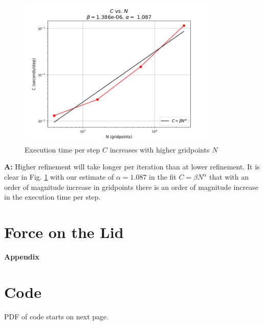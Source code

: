 \documentclass[11pt]{article}
\begin{document}
\begin{figure}[H]
   \centering
   \includegraphics[width=0.85\textwidth]{images/Refinement_Measure.png}
   \caption{Execution time per step $C$ increases with higher gridpoints $N$}
   \label{timerefine}
\end{figure}

\begin{center} 
\end{center}

\textbf{A:} Higher refinement will take longer per iteration than at lower refinement. It is clear in Fig. \ref{timerefine} with our estimate of $\alpha = 1.087$ in the fit $C = \beta N^{\alpha}$ that with an order of magnitude increase in gridpoints there is an order of magnitude increase in the execution time per step.

\pagebreak

\section{Force on the Lid}


\pagebreak
\appendix
{} 
\begin{center}
\vspace*{\fill}
   \Huge \bf Appendix 
\vspace*{\fill}
\end{center}
\pagebreak 

\hypertarget{code}{}
\section{Code}
PDF of code starts on next page.
\end{document}
